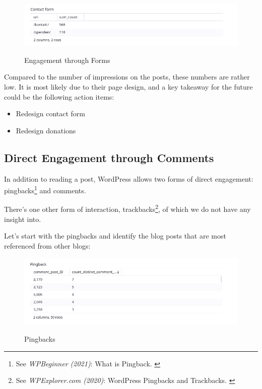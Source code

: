 \begin{figure}[H]
\centering
\caption {Engagement through Forms}
\includegraphics[width=\linewidth]{images/figure14.png}
\label{fig:engagementForms}
\end{figure}

Compared to the number of impressions on the posts, these numbers are rather low. It is most likely due to their page design, and a key takeaway for the future could be the following action items:

\begin{itemize}
 \item Redesign contact form
 \item Redesign donations
\end{itemize}

\subsection{Direct Engagement through Comments}

In addition to reading a post, WordPress allows two forms of direct engagement: pingbacks\footnote{See \textit{WPBeginner (2021)}: What is Pingback. \cite{pingBack}} and comments. 

There's one other form of interaction, trackbacks\footnote{See \textit{WPExplorer.com (2020)}: WordPress Pingbacks and Trackbacks. \cite{trackBack}}, of which we do not have any insight into.

Let's start with the pingbacks and identify the blog posts that are most referenced from other blogs:

\begin{figure}[H]
\centering
\caption {Pingbacks}
\includegraphics[width=\linewidth]{images/figure15.png}
\label{fig:pingbacks}
\end{figure}


